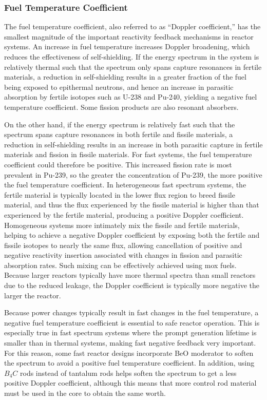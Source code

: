 \subsubsection{Fuel Temperature Coefficient}
The fuel temperature coefficient, also referred to as ``Doppler coefficient,'' has the smallest magnitude of the important reactivity feedback mechanisms in reactor systems. An increase in fuel temperature increases Doppler broadening, which reduces the effectiveness of self-shielding. If the energy spectrum in the system is relatively thermal such that the spectrum only spans capture resonances in fertile materials, a reduction in self-shielding results in a greater fraction of the fuel being exposed to epithermal neutrons, and hence an increase in parasitic absorption by fertile isotopes such as U-238 and Pu-240, yielding a negative fuel temperature coefficient. Some fission products are also resonant absorbers. 

On the other hand, if the energy spectrum is relatively fast such that the spectrum spans capture resonances in both fertile and fissile materials, a reduction in self-shielding results in an increase in both parasitic capture in fertile materials and fission in fissile materials. For fast systems, the fuel temperature coefficient could therefore be positive. This increased fission rate is most prevalent in Pu-239, so the greater the concentration of Pu-239, the more positive the fuel temperature coefficient. In heterogeneous fast spectrum systems, the fertile material is typically located in the lower flux region to breed fissile material, and thus the flux experienced by the fissile material is higher than that experienced by the fertile material, producing a positive Doppler coefficient. Homogeneous systems more intimately mix the fissile and fertile materials, helping to achieve a negative Doppler coefficient by exposing both the fertile and fissile isotopes to nearly the same flux, allowing cancellation of positive and negative reactivity insertion associated with changes in fission and parasitic absorption rates. Such mixing can be effectively achieved using \gls{mox} fuels. Because larger reactors typically have more thermal spectra than small reactors due to the reduced leakage, the Doppler coefficient is typically more negative the larger the reactor.

Because power changes typically result in fast changes in the fuel temperature, a negative fuel temperature coefficient is essential to safe reactor operation. This is especially true in fast spectrum systems where the prompt generation lifetime is smaller than in thermal systems, making fast negative feedback very important. For this reason, some fast reactor designs incorporate BeO moderator to soften the spectrum to avoid a positive fuel temperature coefficient. In addition, using \(B_4C\) rods instead of tantalum rods helps soften the spectrum to get a less positive Doppler coefficient, although this means that more control rod material must be used in the core to obtain the same worth. 

